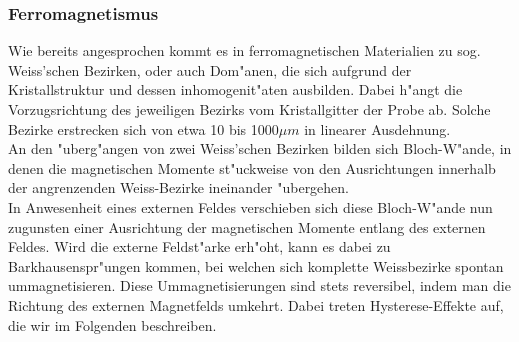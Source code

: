        \subsubsection*{Ferromagnetismus}
            Wie bereits angesprochen kommt es in ferromagnetischen Materialien zu sog. Weiss'schen Bezirken,
            oder auch Dom"anen, die sich aufgrund der Kristallstruktur und dessen inhomogenit"aten ausbilden. Dabei
            h"angt die Vorzugsrichtung des jeweiligen Bezirks vom Kristallgitter der Probe ab. Solche
            Bezirke erstrecken sich von etwa 10 bis 1000$\mu m$ in linearer Ausdehnung.\\
            An den "uberg"angen von zwei Weiss'schen Bezirken bilden sich Bloch-W"ande, in denen die magnetischen Momente st"uckweise von den Ausrichtungen innerhalb der angrenzenden Weiss-Bezirke ineinander "ubergehen.\\
            In Anwesenheit eines externen Feldes verschieben sich diese Bloch-W"ande nun zugunsten einer Ausrichtung der magnetischen Momente entlang des externen Feldes. Wird die externe Feldst"arke erh"oht, kann es dabei zu Barkhausenspr"ungen kommen, bei welchen sich komplette Weissbezirke spontan ummagnetisieren. Diese Ummagnetisierungen sind stets reversibel, indem man die Richtung des externen Magnetfelds umkehrt. Dabei treten Hysterese-Effekte auf, die wir im Folgenden beschreiben.
